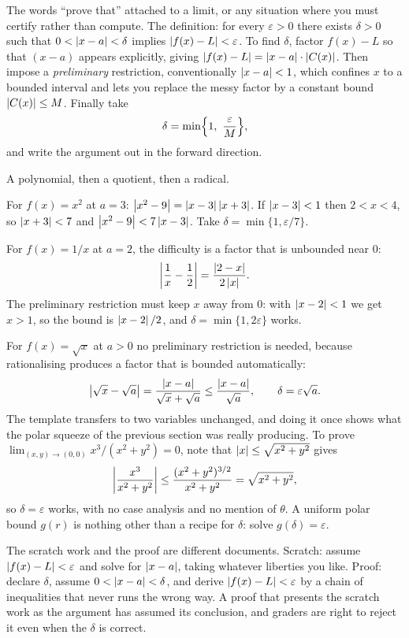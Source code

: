 \cue The words ``prove that'' attached to a limit, or any situation where you must certify rather than compute.
\method The definition: for every $\varepsilon>0$ there exists $\delta>0$ such that $0<\left\lvert x-a\right\rvert<\delta$ implies $\left\lvert f(x)-L\right\rvert<\varepsilon$. To find $\delta$, factor $f(x)-L$ so that $(x-a)$ appears explicitly, giving $\left\lvert f(x)-L\right\rvert=\left\lvert x-a\right\rvert\cdot\left\lvert C(x)\right\rvert$. Then impose a \emph{preliminary} restriction, conventionally $\left\lvert x-a\right\rvert<1$, which confines $x$ to a bounded interval and lets you replace the messy factor by a constant bound $\left\lvert C(x)\right\rvert\leq M$. Finally take
\[\delta=\min\Bigl\{1,\ \frac{\varepsilon}{M}\Bigr\},\]
and write the argument out in the forward direction.

\begin{worked}
A polynomial, then a quotient, then a radical.

For $f(x)=x^{2}$ at $a=3$: $\left\lvert x^{2}-9\right\rvert=\left\lvert x-3\right\rvert\left\lvert x+3\right\rvert$. If $\left\lvert x-3\right\rvert<1$ then $2<x<4$, so $\left\lvert x+3\right\rvert<7$ and $\left\lvert x^{2}-9\right\rvert<7\left\lvert x-3\right\rvert$. Take $\delta=\min\{1,\varepsilon/7\}$.

For $f(x)=1/x$ at $a=2$, the difficulty is a factor that is unbounded near $0$:
\[\left\lvert \frac1x-\frac12\right\rvert=\frac{\left\lvert 2-x\right\rvert}{2\left\lvert x\right\rvert} .\]
The preliminary restriction must keep $x$ away from $0$: with $\left\lvert x-2\right\rvert<1$ we get $x>1$, so the bound is $\left\lvert x-2\right\rvert/2$, and $\delta=\min\{1,2\varepsilon\}$ works.

For $f(x)=\sqrt{x}$ at $a>0$ no preliminary restriction is needed, because rationalising produces a factor that is bounded automatically:
\[\left\lvert \sqrt x-\sqrt a\right\rvert=\frac{\left\lvert x-a\right\rvert}{\sqrt x+\sqrt a}\leq\frac{\left\lvert x-a\right\rvert}{\sqrt a},\qquad \delta=\varepsilon\sqrt a .\]
The template transfers to two variables unchanged, and doing it once shows what the polar squeeze of the previous section was really producing. To prove $\lim_{(x,y)\to(0,0)}x^{3}/(x^{2}+y^{2})=0$, note that $\left\lvert x\right\rvert\leq\sqrt{x^{2}+y^{2}}$ gives
\[\left\lvert \frac{x^{3}}{x^{2}+y^{2}}\right\rvert\leq\frac{(x^{2}+y^{2})^{3/2}}{x^{2}+y^{2}}=\sqrt{x^{2}+y^{2}} ,\]
so $\delta=\varepsilon$ works, with no case analysis and no mention of $\theta$. A uniform polar bound $g(r)$ is nothing other than a recipe for $\delta$: solve $g(\delta)=\varepsilon$.
\end{worked}

\begin{keynote}
The scratch work and the proof are different documents. Scratch: assume $\left\lvert f(x)-L\right\rvert<\varepsilon$ and solve for $\left\lvert x-a\right\rvert$, taking whatever liberties you like. Proof: declare $\delta$, assume $0<\left\lvert x-a\right\rvert<\delta$, and derive $\left\lvert f(x)-L\right\rvert<\varepsilon$ by a chain of inequalities that never runs the wrong way. A proof that presents the scratch work as the argument has assumed its conclusion, and graders are right to reject it even when the $\delta$ is correct.
\end{keynote}

